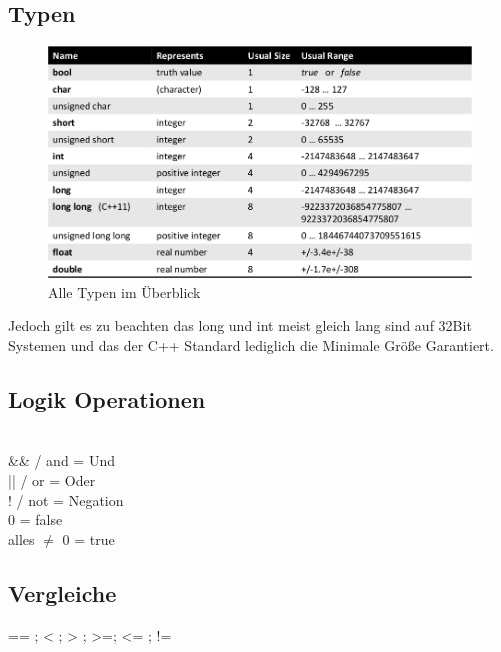 \subsection{Typen}
\begin{figure}[h]
\centering
\includegraphics[width=0.75\linewidth]{mainmatter/pics/typ}
\caption[typen]{Alle Typen im Überblick}
\label{fig:typ}
\end{figure}
Jedoch gilt es zu beachten das long und int meist gleich lang sind auf 32Bit Systemen und das der C++ Standard lediglich die Minimale Größe Garantiert.
\subsection{Logik Operationen}\qquad\\
\&\& / and = Und\\
|| / or = Oder\\
! / not = Negation\\
0 = false\\
alles $\neq$ 0 = true
\subsection{Vergleiche}
== ; < ; > ; >=; <= ; !=
		

